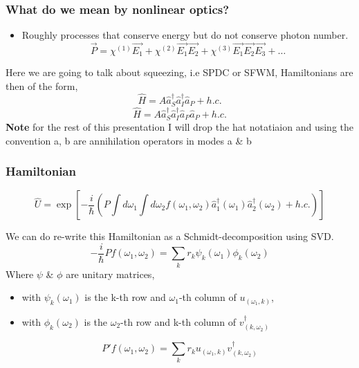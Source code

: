 \documentclass{beamer}
\renewcommand{\annia}{\hat{a}}
\renewcommand{\creata}{\hat{a}^\dagger}
\begin{document}
\begin{frame}
\frametitle{What do we mean by nonlinear optics?}
\begin{itemize} 
    \item Roughly processes that conserve energy but do not conserve photon number. 
        \begin{equation}
            \vec{P}= \chi^{(1)} \vec{E_1} + \chi^{(2)}\vec{E_1}\vec{E_2} + \chi^{(3)}\vec{E_1}\vec{E_2}\vec{E_3} + \dots
        \end{equation}
\end{itemize}
Here we are going to talk about squeezing, i.e SPDC or SFWM, Hamiltonians are then of the form, 
\begin{equation} 
    \hat{H} = A \creata_S \creata_I \annia_P + h.c.
\end{equation}
\begin{equation} 
    \hat{H} = A \creata_S \creata_I \annia_P \annia_P + h.c.
\end{equation}
\textbf{Note} for the rest of this presentation I will drop the hat notatiaion and using the convention a, b are annihilation operators in modes a \& b
\end{frame}

\begin{frame}
    \frametitle{Hamiltonian}
    
    \begin{equation}
        \hat{U} = \exp[-\frac{i}{\hbar}\left( P \int d\omega_1 \int d\omega_2 f(\omega_1,\omega_2) \creata_1(\omega_1) \creata_2(\omega_2) + h.c. \right) ]
    \end{equation}
\end{frame}
\begin{frame}
    We can do re-write this Hamiltonian as a Schmidt-decomposition using SVD.
    \begin{equation}
    -\frac{i}{\hbar}P f(\omega_1,\omega_2) = \sum_k r_k \psi_k(\omega_1) \phi_k(\omega_2)
    \end{equation}
    Where $ \psi $ \& $\phi $ are unitary matrices,
    \begin{itemize}
        \item with $ \psi_k(\omega_1) $ is the k-th row and $\omega_1$-th column of $u_{(\omega_1, k)}$,
        \item with $ \phi_k(\omega_2) $ is the $\omega_2$-th row and k-th column of $v^\dagger_{(k,\omega_2)}$
    \end{itemize}
    \begin{equation}
        P' f(\omega_1, \omega_2) = \sum_k r_k u_{(\omega_1, k)} v_{(k, \omega_2)}^\dagger
    \end{equation}
\end{frame}
\end{document}
